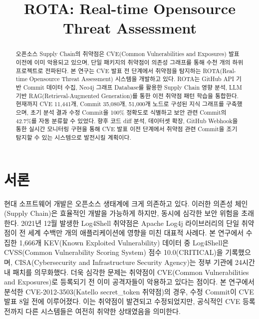﻿\documentclass[conference]{IEEEtran}
\begin{document}
\sloppy
\setlength{\parskip}{0.3em}
\setlength{\parindent}{1em}

\renewcommand{\thesubsection}{\arabic{subsection}}

\title{ROTA: Real-time Opensource Threat Assessment}

\author{
}

\maketitle

\pagestyle{plain}
\thispagestyle{plain}

\begin{abstract}
오픈소스 Supply Chain의 취약점은 CVE(Common Vulnerabilities and Exposures) 발표 이전에 이미 악용되고 있으며, 단일 패키지의 취약점이 의존성 그래프를 통해 수천 개의 하위 프로젝트로 전파된다. 본 연구는 CVE 발표 전 단계에서 취약점을 탐지하는 ROTA(Real-time Opensource Threat Assessment) 시스템을 개발하고 있다. ROTA는 GitHub API 기반 Commit 데이터 수집, Neo4j 그래프 Database를 활용한 Supply Chain 영향 분석, LLM 기반 RAG(Retrieval-Augmented Generation)를 통한 이전 취약점 패턴 학습을 통합한다. 현재까지 CVE 11,441개, Commit 35,080개, 51,000개 노드로 구성된 지식 그래프를 구축했으며, 초기 분석 결과 수정 Commit을 100\% 정확도로 식별하고 보안 관련 Commit의 42.7\%를 자동 분류할 수 있었다. 향후 코드 diff 분석, 데이터셋 확장, GitHub Webhook을 통한 실시간 모니터링 구현을 통해 CVE 발표 이전 단계에서 취약점 관련 Commit을 조기 탐지할 수 있는 시스템으로 발전시킬 계획이다.
\end{abstract}

\section{서론}

\indent 현대 소프트웨어 개발은 오픈소스 생태계에 크게 의존하고 있다. 이러한 의존성 체인(Supply Chain)은 효율적인 개발을 가능하게 하지만, 동시에 심각한 보안 위험을 초래한다. 2021년 12월 발생한 Log4Shell 취약점은 Apache Log4j 라이브러리의 단일 취약점이 전 세계 수백만 개의 애플리케이션에 영향을 미친 대표적 사례다. 본 연구에서 수집한 1,666개 KEV(Known Exploited Vulnerability) 데이터 중 Log4Shell은 CVSS(Common Vulnerability Scoring System) 점수 10.0(CRITICAL)을 기록했으며, CISA(Cybersecurity and Infrastructure Security Agency)는 정부 기관에 24시간 내 패치를 의무화했다. 더욱 심각한 문제는 취약점이 CVE(Common Vulnerabilities and Exposures)로 등록되기 전 이미 공격자들이 악용하고 있다는 점이다. 본 연구에서 분석한 CVE-2012-3503(Katello secret\_token 취약점)의 경우, 수정 Commit이 CVE 발표 8일 전에 이루어졌다. 이는 취약점이 발견되고 수정되었지만, 공식적인 CVE 등록 전까지 다른 시스템들은 여전히 취약한 상태였음을 의미한다.
\end{document}
